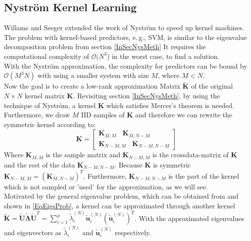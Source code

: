 \subsection{Nyström Kernel Learning}\label{InSubSecNyKerneLearning}
Willams and Seeger extended the work of Nyström to speed up kernel machines.
The problem with kernel-based predictors, e.\,g., \acs{SVM}, is similar to the eigenvalue decomposition problem from section \ref{InSecNysMeth}
It requires the computational complexity of $\mathcal{O}(N^3$) in the worst case, to find a solution.\cite{Williams.2000}\\
With the Nyström approximation, the complexity for predictors can be bound by $\mathcal{O}(M^3N)$ with using a smaller system with size $M$, where $M<N$.\cite{Williams.2000}\\	
Now the goal is to create a low-rank approximation Matrix $\tilde{\mathbf{K}}$ of the original $N\times N$ kernel matrix $\mathbf{K}$.
Revisiting section \ref{InSecNysMeth}, by using the technique of Nyström, a kernel $\mathbf{K}$ which satisfies Mercer's theorem is needed.\cite{Williams.2000}
Furthermore, we draw $M$ \acs{IID} samples of $\mathbf{K}$ and therefore we can rewrite the symmetric kernel according to:\cite{Nemtsov.2016}
\begin{equation}\label{EqNystKernelParts}
	\mathbf{K} = 
	\begin{bmatrix}
		 \mathbf{K}_{M,M}\>\>\>\> \mathbf{K}_{M,N-M} \\
		 \mathbf{K}_{N-M,M}\>\>\>\> \mathbf{K}_{N-M,N-M}
	\end{bmatrix}
\end{equation}
Where $\mathbf{K}_{M,M}$ is the sample matrix and $\mathbf{K}_{N-M,M}$ is the crossdata-matrix of $\mathbf{K}$ and the rest of the data $\mathbf{K}_{N-M,N-M}$.
Because $\mathbf{K}$ is symmetric $\mathbf{K}_{N-M,M} = (\mathbf{K}_{M,N-M})^T$.
Furthermore, $\mathbf{K}_{N-M,N-M}$ is the part of the kernel which is not sampled or 'used' for the approximation, as we will see.\\
Motivated by the general eigenvalue problem, which can be obtained from \cite[p. 221]{Hartmann.2015} and shown in \eqref{EqEigsProb}, a kernel can be approximated through another kernel $\tilde{\mathbf{K}} = \tilde{\mathbf{U}}\tilde{\mathbf{\Lambda}}\tilde{\mathbf{U}}^T=\sum_{i=1}^{p}\tilde{\lambda}_i^{(N)}\tilde{\mathbf{u}}_i^{(N)}(\tilde{\mathbf{u}}_i^{(N)})^T$.\cite{Williams.2000}
With the approximated eigenvalues and eigenvectors as $\tilde{\lambda}_i^{(N)}$ and $\tilde{\mathbf{u}}_i^{(N)}$ respectively.\\

